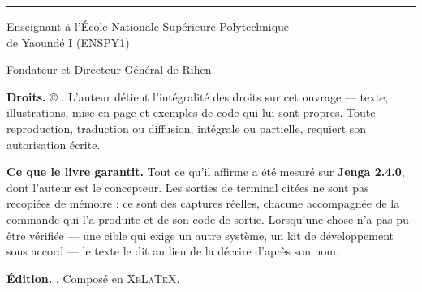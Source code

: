 %
\thispagestyle{empty}
\null\vfill

\begin{center}
{\sffamily\bfseries\large\color{rihenTeal}\DocTitre\par}
\vspace{4pt}
{\color{rihenOrange}\rule{3.2cm}{1.6pt}\par}
\end{center}

\vspace{18pt}

\begin{center}
{\sffamily\bfseries\color{grisTexte}\DocAuteur\par}
\vspace{9pt}
{\sffamily\small\color{grisTexte}
Enseignant à l'École Nationale Supérieure Polytechnique\\
de Yaoundé I (ENSPY1)\par}
\vspace{4pt}
{\sffamily\small\color{grisTexte}
Fondateur et Directeur Général de Rihen\par}
\end{center}

\vspace{26pt}

\begin{center}
\begin{minipage}{0.82\textwidth}
{\small
\textbf{Droits.} \copyright{} \DocAnnee{} \DocAuteur. L'auteur détient
l'intégralité des droits sur cet ouvrage --- texte, illustrations, mise en page
et exemples de code qui lui sont propres. Toute reproduction, traduction ou
diffusion, intégrale ou partielle, requiert son autorisation écrite.

\vspace{8pt}
\textbf{Ce que le livre garantit.} Tout ce qu'il affirme a été mesuré sur
\textbf{Jenga 2.4.0}, dont l'auteur est le concepteur. Les sorties de terminal
citées ne sont pas recopiées de mémoire : ce sont des captures réelles, chacune
accompagnée de la commande qui l'a produite et de son code de sortie. Lorsqu'une
chose n'a pas pu être vérifiée --- une cible qui exige un autre système, un
kit de développement sous accord --- le texte le dit au lieu de la décrire
d'après son nom.

\vspace{8pt}
\textbf{Édition.} \DocDate. Composé en \textsc{XeLaTeX}.
\par}
\end{minipage}
\end{center}

